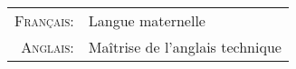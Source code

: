 \begin{tabular}{>{\small}r>{\small}l}
 \parbox{\datebox}{\raggedleft\textsc{Français:}}&Langue maternelle\\
\textsc{Anglais:}&Maîtrise de l'anglais technique\\
\end{tabular}